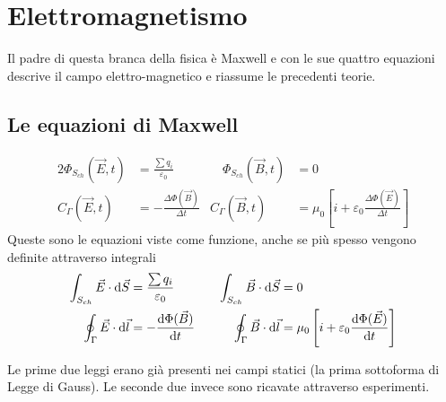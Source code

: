 
\section{Elettromagnetismo}
Il padre di questa branca della fisica è Maxwell e con le sue quattro equazioni descrive il campo
elettro-magnetico e riassume le precedenti teorie.
\subsection{Le equazioni di Maxwell}
\begin{alignat*}{2}
  \Phi_{S_{ch}}(\vec{E},t) &= \frac{\sum q_i}{\varepsilon_0} &\quad \Phi_{S_{ch}}(\vec{B},t)&=0\\
  C_\Gamma(\vec{E},t) &= -\frac{\Delta \Phi(\vec{B})}{\Delta t} & C_\Gamma(\vec{B},t) &=
  \mu_0 \left[ i+\varepsilon_0 \frac{\Delta\Phi(\vec{E})}{\Delta t} \right]
\end{alignat*}
Queste sono le equazioni viste come funzione, anche se più spesso vengono definite attraverso
integrali
\begin{alignat*}{2}
  \int_{S_{ch}}\vec{E}\cdot\dif\vec{S} &= \frac{\sum q_i}{\varepsilon_0} &\quad 
  \int_{S_{ch}}\vec{B}\cdot\dif\vec{S}&=0\\
  \oint_\Gamma\vec{E}\cdot\dif\vec{l}&=-\der{\Phi(\vec{B})}{t} & 
  \oint_\Gamma\vec{B}\cdot\dif\vec{l}&=
  \mu_0 \left[ i+\varepsilon_0 \der{\Phi(\vec{E})}{t} \right]
\end{alignat*}

Le prime due leggi erano già presenti nei campi statici (la prima sottoforma di Legge di Gauss). Le
seconde due invece sono ricavate attraverso esperimenti.

